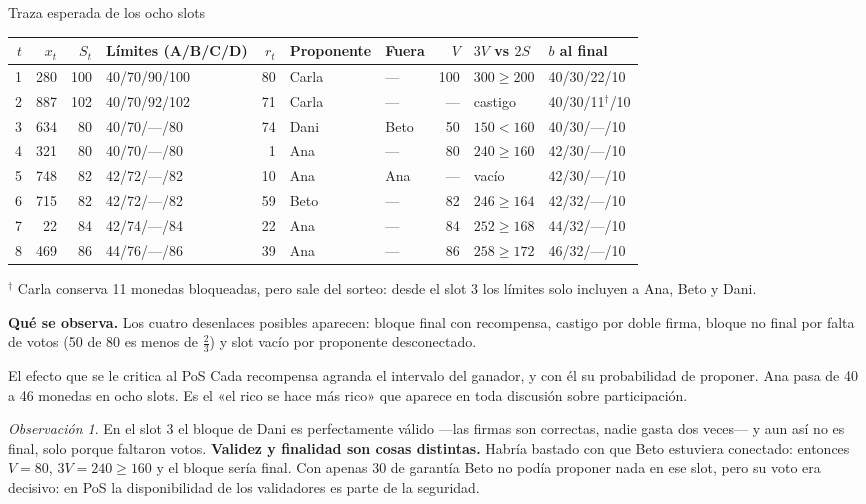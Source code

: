 \documentclass[11pt,a4paper]{article}
\theoremstyle{definition}
\theoremstyle{plain}
\theoremstyle{remark}
\newtheorem*{observacion}{Observación}
\begin{document}
\begin{laboratorio}{Traza esperada de los ocho slots}
\centering
\footnotesize
\begin{tabular}{@{}rrrlrllrll@{}}
\toprule
$t$ & $x_t$ & $S_t$ & Límites (A/B/C/D) & $r_t$ & Proponente & Fuera & $V$ & $3V$ vs $2S$ & $b$ al final \\
\midrule
1 & 280 & 100 & 40/70/90/100 & 80 & Carla & — & 100 & $300 \ge 200$ & 40/30/22/10 \\
2 & 887 & 102 & 40/70/92/102 & 71 & Carla & — & —  & castigo       & 40/30/11$^\dagger$/10 \\
3 & 634 & 80  & 40/70/—/80   & 74 & Dani  & Beto & 50 & $150 < 160$ & 40/30/—/10 \\
4 & 321 & 80  & 40/70/—/80   & 1  & Ana   & — & 80  & $240 \ge 160$ & 42/30/—/10 \\
5 & 748 & 82  & 42/72/—/82   & 10 & Ana   & Ana & — & vacío        & 42/30/—/10 \\
6 & 715 & 82  & 42/72/—/82   & 59 & Beto  & — & 82  & $246 \ge 164$ & 42/32/—/10 \\
7 & 22  & 84  & 42/74/—/84   & 22 & Ana   & — & 84  & $252 \ge 168$ & 44/32/—/10 \\
8 & 469 & 86  & 44/76/—/86   & 39 & Ana   & — & 86  & $258 \ge 172$ & 46/32/—/10 \\
\bottomrule
\end{tabular}

\vspace{0.5em}
\raggedright\footnotesize
$^\dagger$ Carla conserva 11 monedas bloqueadas, pero sale del sorteo: desde el
slot 3 los límites solo incluyen a Ana, Beto y Dani.
\end{laboratorio}

\textbf{Qué se observa.} Los cuatro desenlaces posibles aparecen: bloque final
con recompensa, castigo por doble firma, bloque no final por falta de votos
(50 de 80 es menos de $\frac23$) y slot vacío por proponente desconectado.

\begin{aviso}{El efecto que se le critica al PoS}
Cada recompensa agranda el intervalo del ganador, y con él su probabilidad de
proponer. Ana pasa de 40 a 46 monedas en ocho slots. Es el «el rico se hace más
rico» que aparece en toda discusión sobre participación.
\end{aviso}

\begin{observacion}
En el slot 3 el bloque de Dani es perfectamente válido —las firmas son
correctas, nadie gasta dos veces— y aun así no es final, solo porque faltaron
votos. \textbf{Validez y finalidad son cosas distintas.} Habría bastado con que
Beto estuviera conectado: entonces $V = 80$, $3V = 240 \ge 160$ y el bloque sería
final. Con apenas 30 de garantía Beto no podía proponer nada en ese slot, pero su
voto era decisivo: en PoS la disponibilidad de los validadores es parte de la
seguridad.
\end{observacion}
\end{document}
